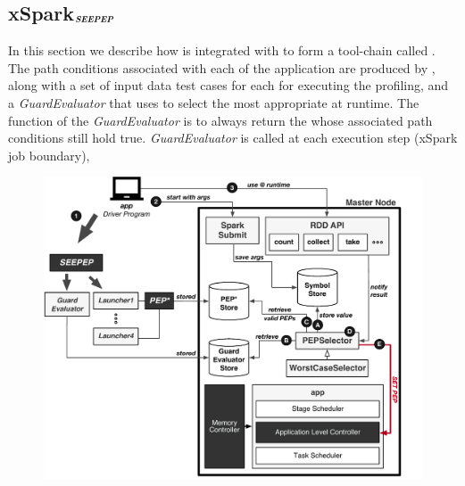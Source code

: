 

\subsection{xSpark$_{\text{\textit{\textbf{SEEPEP}}}}$}\label{sec:xspark_seepep}
In this section we describe how \dSymb is integrated with \cSpark to form a tool-chain called \tool. The path conditions associated with each \plan of the application are produced by \dSymb, along with a set of input data test cases for each \plan for executing the profiling, and a \textit{GuardEvaluator} that \cSpark uses to select the most appropriate \plan at runtime. The function of the \textit{GuardEvaluator} is to always return the \plans whose associated path conditions still hold true. \textit{GuardEvaluator} is called at each execution step (xSpark job boundary), 

\begin{figure}[tbhp]
	\centering
	\includegraphics[width=\columnwidth]{images/xsparksymb}
	\caption{\tool}
	\label{fig:xsparkdagsymb}
\end{figure}

